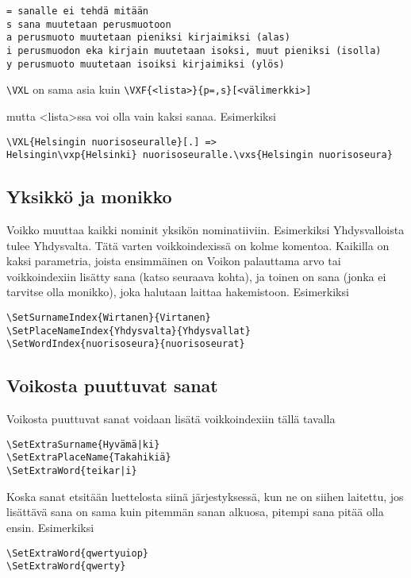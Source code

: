 \documentclass[12pt]{article}
\begin{document}
\begin{verbatim}
= sanalle ei tehdä mitään
s sana muutetaan perusmuotoon
a perusmuoto muutetaan pieniksi kirjaimiksi (alas)
i perusmuodon eka kirjain muutetaan isoksi, muut pieniksi (isolla)
y perusmuoto muutetaan isoiksi kirjaimiksi (ylös)
\end{verbatim}


\verb=\VXL= on sama asia kuin \verb|\VXF{<lista>}{p=,s}[<välimerkki>]|

mutta <lista>ssa voi olla vain kaksi sanaa. Esimerkiksi

\begin{verbatim}
\VXL{Helsingin nuorisoseuralle}[.] =>
Helsingin\vxp{Helsinki} nuorisoseuralle.\vxs{Helsingin nuorisoseura}
\end{verbatim}


\subsection*{Yksikkö ja monikko}

Voikko muuttaa kaikki nominit yksikön nominatiiviin. Esimerkiksi
Yhdysvalloista tulee Yhdysvalta. Tätä varten voikkoindexissä on kolme
komentoa. Kaikilla on kaksi parametria, joista ensimmäinen on Voikon
palauttama arvo tai voikkoindexiin lisätty sana (katso seuraava
kohta), ja toinen on sana (jonka ei tarvitse olla monikko), joka
halutaan laittaa hakemistoon. Esimerkiksi

\begin{verbatim}
\SetSurnameIndex{Wirtanen}{Virtanen}
\SetPlaceNameIndex{Yhdysvalta}{Yhdysvallat}
\SetWordIndex{nuorisoseura}{nuorisoseurat}
\end{verbatim}


\subsection*{Voikosta puuttuvat sanat}

Voikosta puuttuvat sanat voidaan lisätä voikkoindexiin tällä tavalla

\begin{verbatim}
\SetExtraSurname{Hyvämä|ki}
\SetExtraPlaceName{Takahikiä}
\SetExtraWord{teikar|i}
\end{verbatim}

Koska sanat etsitään luettelosta siinä järjestyksessä, kun ne on
siihen laitettu, jos lisättävä sana on sama kuin pitemmän sanan
alkuosa, pitempi sana pitää olla ensin. Esimerkiksi

\begin{verbatim}
\SetExtraWord{qwertyuiop}
\SetExtraWord{qwerty}
\end{verbatim}
\end{document}
